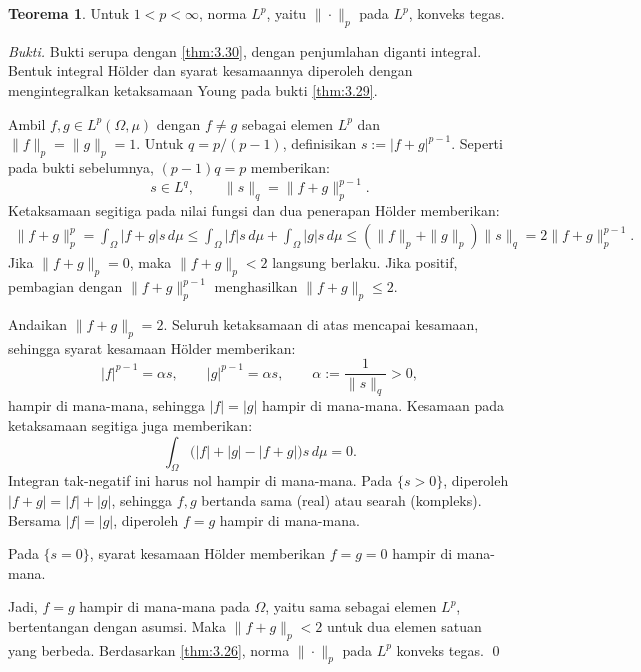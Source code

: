 \documentclass[aspectratio=169,11pt]{beamer}
\theoremstyle{definition}
\newtheorem{teorema}{Teorema}
\newcommand{\myref}[1]{\hyperref[#1]{\nameCref{#1} \ref*{#1}}}
\begin{document}
\begin{frame}[allowframebreaks=1]{\insertsection}{\insertsubsection}
  \setcounter{teorema}{31}
  \begin{teorema}\label{thm:3.32}
    Untuk $1<p<\infty$, norma $L^p$, yaitu $\|\cdot\|_p$ pada $L^p$, konveks tegas.
  \end{teorema}
  \textit{Bukti.}
  Bukti serupa dengan \myref{thm:3.30}, dengan penjumlahan diganti integral. Bentuk integral H\"older dan syarat kesamaannya diperoleh dengan mengintegralkan ketaksamaan Young pada bukti \myref{thm:3.29}.

  Ambil $f,g\in L^p(\Omega,\mu)$ dengan $f\neq g$ sebagai elemen $L^p$ dan $\|f\|_p=\|g\|_p=1$. Untuk $q=p/(p-1)$, definisikan $s:=|f+g|^{p-1}$. Seperti pada bukti sebelumnya, $(p-1)q=p$ memberikan:
  \begin{equation*}
    s\in L^q, \qquad \|s\|_q=\|f+g\|_p^{p-1}.
  \end{equation*}
  Ketaksamaan segitiga pada nilai fungsi dan dua penerapan H\"older memberikan:
  \begin{align*}
    \|f+g\|_p^p=\int_\Omega |f+g|s\,d\mu                         \leq\int_\Omega |f|s\,d\mu+\int_\Omega |g|s\,d\mu \leq(\|f\|_p+\|g\|_p)\|s\|_q=2\|f+g\|_p^{p-1}.
  \end{align*}
  Jika $\|f+g\|_p=0$, maka $\|f+g\|_p<2$ langsung berlaku. Jika positif, pembagian dengan $\|f+g\|_p^{p-1}$ menghasilkan $\|f+g\|_p\leq 2$.


  Andaikan $\|f+g\|_p=2$. Seluruh ketaksamaan di atas mencapai kesamaan, sehingga syarat kesamaan H\"older memberikan:
  \begin{equation*}
    |f|^{p-1}=\alpha s, \qquad |g|^{p-1}=\alpha s,
    \qquad \alpha:=\frac{1}{\|s\|_q}>0,
  \end{equation*}
  hampir di mana-mana, sehingga $|f|=|g|$ hampir di mana-mana. Kesamaan pada ketaksamaan segitiga juga memberikan:
  \begin{equation*}
    \int_\Omega \bigl(|f|+|g|-|f+g|\bigr)s\,d\mu=0.
  \end{equation*}
  Integran tak-negatif ini harus nol hampir di mana-mana. Pada $\{s>0\}$, diperoleh $|f+g|=|f|+|g|$, sehingga $f,g$ bertanda sama (real) atau searah (kompleks). Bersama $|f|=|g|$, diperoleh $f=g$ hampir di mana-mana.

  Pada $\{s=0\}$, syarat kesamaan H\"older memberikan $f=g=0$ hampir di mana-mana.

  Jadi, $f=g$ hampir di mana-mana pada $\Omega$, yaitu sama sebagai elemen $L^p$, bertentangan dengan asumsi. Maka $\|f+g\|_p<2$ untuk dua elemen satuan yang berbeda. Berdasarkan \myref{thm:3.26}, norma $\|\cdot\|_p$ pada $L^p$ konveks tegas. \qed
\end{frame}
\end{document}
